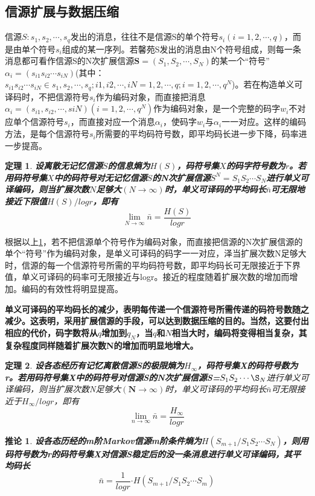 \documentclass[UTF8]{ctexart}
\theoremstyle{plain}
\newtheorem{theorem}{定理}[section]
\newtheorem{corollary}{推论}[section]
\theoremstyle{definition}
\theoremstyle{remark}
\begin{document}
\subsection{信源扩展与数据压缩}
信源$S:{s_1,s_2,\cdots,s_q}$发出的消息，往往不是信源S的单个符号$s_i(i=1,2,\cdots,q)$，而是由单个符号$s_i$组成的某一序列。若馨苑S发出的消息由N个符号组成，则每一条消息都可看作信源S的N次扩展信源$\textbf{S}=(S_1,S_2,\cdots,S_N)$的某一个“符号”$\alpha_i= (s_{i1}s_{i2}\cdots s_{iN})$(其中：$s_{i1}s_{i2}\cdots s_{iN}\in {s_1,s_2,\cdots,s_q};i1,i2,\cdots,iN=1,2,\cdots,q;i=1,2,\cdots,q^N$)。若在构造单义可译码时，不把信源符号$s_i$作为编码对象，而直接把消息$\alpha_i=(s_{i1},s_{i2},\cdots,s{iN})(i=1,2,\cdots,q^N)$作为编码对象，是一个完整的码字$w_i$不对应单个信源符号$s_i$，而直接对应一个消息$\alpha_i$，使码字$w_i$与$\alpha_i$一一对应。这样的编码方法，是每个信源符号$s_i$所需要的平均码符号数，即平均码长进一步下降，码率进一步提高。
\begin{theorem}
	\label{th6.5}
	\textbf{设离散无记忆信源$S$的信息熵为$H(S)$，码符号集$X$的码字符号数为$r$。若用码符号集$X$中的码符号对无记忆信源$S$的N次扩展信源$S^N=S_1S_2\cdots S_N$进行单义可译编码，则当扩展次数$N$足够大$(N\rightarrow\infty)$时，单义可译码的平均码长$\bar{n}$可无限地接近下限值$H(S)/logr$，即有}
	\begin{equation}
	\label{6.67}
	\lim\limits_{N\rightarrow\infty}\bar{n}=\dfrac{H(S)}{logr}
	\end{equation}
\end{theorem}
根据以上\cref{th6.5}，若不把信源单个符号作为编码对象，而直接把信源的N次扩展信源的单个“符号”作为编码对象，是单义可译码的码字一一对应，泽当扩展次数N足够大时，信源的每一个信源符号所需的平均码符号数，即平均码长可无限接近于下界值，单义可译码的码率可无限接近与logr。接近的程度随着扩展次数的增加而增加。编码的有效性将明显提高。

\textcolor[rgb]{1,0,0}{\textbf{单义可译码的平均码长的减少，表明每传递一个信源符号所需传递的码符号数随之减少。这表明，采用扩展信源的手段，可以达到数据压缩的目的。当然，这要付出相应的代价，码字数将从$q$增加到$q_N$，当$q$和$N$相当大时，编码将变得相当复杂，其复杂程度同样随着扩展次数N的增加而明显地增大。}}
\begin{theorem}
	\label{th6.6}
	\textbf{设各态经历有记忆离散信源S的极限熵为$H_{\infty}$，码符号集X的码符号数为r。若用码符号集X中的码符号对信源S的N次扩展信源\textbf{S}=$S_1S_2\cdots\S_N$}进行单义可译编码，则当扩展次数N足够大$\bm{(N\rightarrow\infty)}$时，单义可译码的平均码长$\bar{n}$可无限接近于$H_{\infty}/logr$，即有
	\begin{equation}
	\label{6.76}
	\lim\limits_{n\rightarrow\infty}\bar{n}=\dfrac{H_{\infty}}{logr}
	\end{equation}
\end{theorem}
\begin{corollary}
	\label{co3}
	\textbf{设各态历经的\emph{m}阶\emph{Markov}信源\emph{m}阶条件熵为$H(S_{m+1}/S_1 S_2 \cdots S_N)$，则用码符号数为\emph{r}的码符号集\emph{X}对信源\emph{S}稳定后的没一条消息进行单义可译编码，其平均码长}
	\begin{equation}
	\label{6.89}
	\bar{n}=\dfrac{1}{logr}\bm{\cdot}H(S_{m+1}/S_1 S_2 \cdots S_m)
	\end{equation}
\end{corollary}
\end{document}
